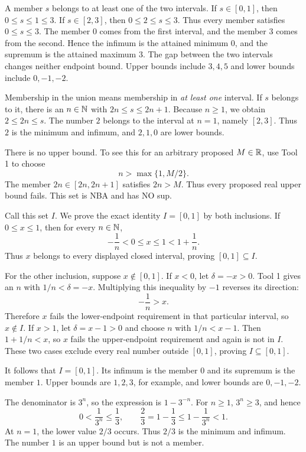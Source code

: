 \label{bounds:g}
A member $s$ belongs to at least one of the two intervals.
If $s\in[0,1]$, then $0\leq s\leq1\leq3$. If $s\in[2,3]$,
then $0\leq2\leq s\leq3$. Thus every member satisfies
$0\leq s\leq3$. The member $0$ comes from the first interval,
and the member $3$ comes from the second. Hence the infimum is
the attained minimum $0$, and the supremum is the attained maximum
$3$. The gap between the two intervals changes neither endpoint
bound. Upper bounds include $3,4,5$ and lower bounds include
$0,-1,-2$.

\label{bounds:h}
Membership in the union means membership in \emph{at least one}
interval. If $s$ belongs to it, there is an $n\in\mathbb{N}$ with
$2n\leq s\leq2n+1$. Because $n\geq1$, we obtain
$2\leq2n\leq s$. The number $2$ belongs to the interval at
$n=1$, namely $[2,3]$. Thus $2$ is the minimum and infimum,
and $2,1,0$ are lower bounds.

There is no upper bound. To see this for an arbitrary proposed
$M\in\mathbb{R}$, use Tool 1 to choose
\[
 n>\max\{1,M/2\}.
\]
The member $2n\in[2n,2n+1]$ satisfies $2n>M$. Thus every proposed
real upper bound fails. This set is NBA and has NO sup.

\label{bounds:i}
Call this set $I$. We prove the exact identity $I=[0,1]$ by both
inclusions. If $0\leq x\leq1$, then for every $n\in\mathbb{N}$,
\[
 -\frac1n<0\leq x\leq1<1+\frac1n.
\]
Thus $x$ belongs to every displayed closed interval, proving
$[0,1]\subseteq I$.

For the other inclusion, suppose $x\notin[0,1]$. If $x<0$, let
$\delta=-x>0$. Tool 1 gives an $n$ with $1/n<\delta=-x$.
Multiplying this inequality by $-1$ reverses its direction:
\[
 -\frac1n>x.
\]
Therefore $x$ fails the lower-endpoint requirement in that particular
interval, so $x\notin I$. If $x>1$, let $\delta=x-1>0$ and
choose $n$ with $1/n<x-1$. Then $1+1/n<x$, so $x$ fails the
upper-endpoint requirement and again is not in $I$. These two cases
exclude every real number outside $[0,1]$, proving $I\subseteq[0,1]$.

It follows that $I=[0,1]$. Its infimum is the member $0$ and its
supremum is the member $1$. Upper bounds are $1,2,3$, for example,
and lower bounds are $0,-1,-2$.

\label{bounds:j}
The denominator is $3^n$, so the expression is $1-3^{-n}$.
For $n\geq1$, $3^n\geq3$, and hence
\[
 0<\frac1{3^n}\leq\frac13,
 \qquad
 \frac23=1-\frac13\leq1-\frac1{3^n}<1.
\]
At $n=1$, the lower value $2/3$ occurs. Thus $2/3$ is the minimum
and infimum. The number $1$ is an upper bound but is not a member.

